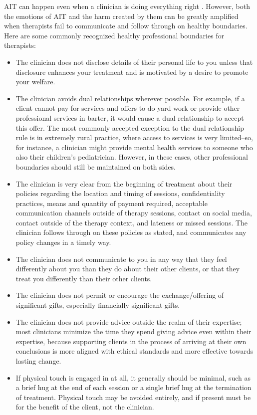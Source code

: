 \documentclass[12pt,letterpaper]{book}
\begin{document}
AIT can happen even when a clinician is doing everything right \cite{transferranceLoveHarm}. However, both the emotions of AIT and the harm created by them can be greatly amplified when therapists fail to communicate and follow through on healthy boundaries. Here are some commonly recognized healthy professional boundaries for therapists:
\begin{itemize}
    \item The clinician does not disclose details of their personal life to you unless that disclosure enhances your treatment and is motivated by a desire to promote your welfare.
    \item The clinician avoids dual relationships wherever possible. For example, if a client cannot pay for services and offers to do yard work or provide other professional services in barter, it would cause a dual relationship to accept this offer. The most commonly accepted exception to the dual relationship rule is in extremely rural practice, where access to services is very limited–so, for instance, a clinician might provide mental health services to someone who also their children's pediatrician. However, in these cases, other professional boundaries should still be maintained on both sides.
    \item The clinician is very clear from the beginning of treatment about their policies regarding the location and timing of sessions, confidentiality practices, means and quantity of payment required, acceptable communication channels outside of therapy sessions, contact on social media, contact outside of the therapy context, and lateness or missed sessions. The clinician follows through on these policies as stated, and communicates any policy changes in a timely way.
    \item The clinician does not communicate to you in any way that they feel differently about you than they do about their other clients, or that they treat you differently than their other clients.
    \item The clinician does not permit or encourage the exchange/offering of significant gifts, especially financially significant gifts.
    \item The clinician does not provide advice outside the realm of their expertise; most clinicians minimize the time they spend giving advice even within their expertise, because supporting clients in the process of arriving at their own conclusions is more aligned with ethical standards and more effective towards lasting change.
    \item If physical touch is engaged in at all, it generally should be minimal, such as a brief hug at the end of each session or a single brief hug at the termination of treatment. Physical touch may be avoided entirely, and if present must be for the benefit of the client, not the clinician.

\end{itemize}
\end{document}

